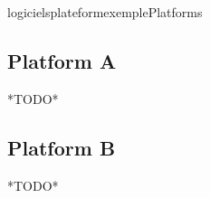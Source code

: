 \documentclass{ra2018}
\begin{document}

 \begin{module}{logiciels}{plateformexemple}{Platforms}  
 \subsection{Platform A}
 *TODO*
 \subsection{Platform B}
 *TODO*
 \end{module}



\end{document}
